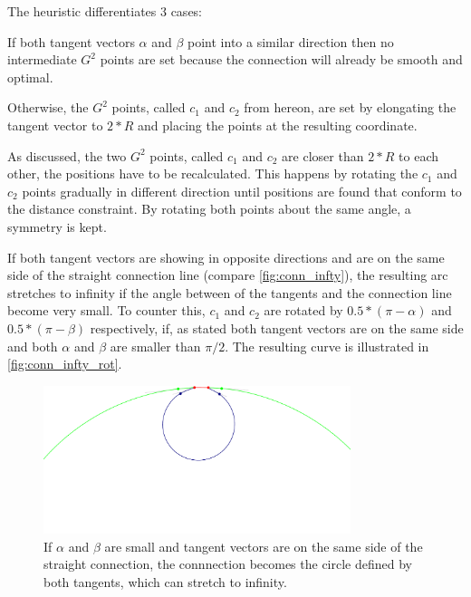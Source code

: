 The heuristic differentiates 3 cases:

If both tangent vectors $\alpha$ and $\beta$ point into a similar direction %
then no intermediate $G^2$ points are set because the connection will already be smooth and optimal.

Otherwise, the $G^2$ points, called $c_1$ and $c_2$ from hereon, are set by elongating the tangent vector to $2*R$ and placing the points at the resulting coordinate.

As discussed, the two $G^2$ points, called $c_1$ and $c_2$ are closer than $2 * R$ to each other, the positions have to be recalculated. This happens by rotating the $c_1$ and $c_2$ points gradually in different direction until positions are found that conform to the distance constraint. By rotating both points about the same angle, a symmetry is kept.

If both tangent vectors are showing in opposite directions and are on the same side of the straight connection line (compare \autoref{fig:conn_infty}), the resulting arc stretches to infinity if the angle between of the tangents and the connection line become very small. To counter this, $c_1$ and $c_2$ are rotated by $0.5 * (\pi - \alpha)$ and $0.5 * (\pi - \beta)$ respectively, if, as stated both tangent vectors are on the same side and both $\alpha$ and $\beta$ are smaller than $\pi/2$. The resulting curve is illustrated in \autoref{fig:conn_infty_rot}.

\begin{figure}
\centering
\includegraphics[width=0.8\textwidth]{images/smooth/tangents_infinity.pdf}
\caption{If $\alpha$ and $\beta$ are small and tangent vectors are on the same side of the straight connection, the connnection becomes the circle defined by both tangents, which can stretch to infinity.}\label{fig:conn_infty}
\end{figure}	

